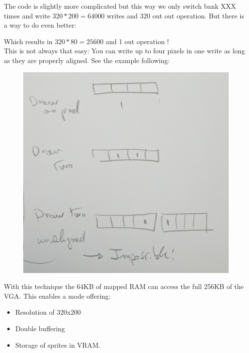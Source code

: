 \documentclass[book.tex]{subfiles}
\begin{document}
The code is slightly more complicated but this way we only switch bank XXX times and write $320*200=64000$ writes and 320 out out operation. But there is a way to do even better:\\
\par
\begin{minipage}{\textwidth}

\end{minipage}

Which results in $320*80=25600$ and 1 out operation !\\

This is not always that easy: You can write up to four pixels in one write as long as they are properly aligned. See the example following:
\begin{figure}[H]
  \centering
 \includegraphics[width=\textwidth]{imgs//vga_multiple_pixel_write.png}
\end{figure}


\par
With this technique the 64KB of mapped RAM can access the full 256KB of the VGA. This enables a mode offering:
\begin{itemize}
  \item Resolution of 320x200
  \item Double buffering
  \item Storage of sprites in VRAM.
\end{itemize}
\end{document}
